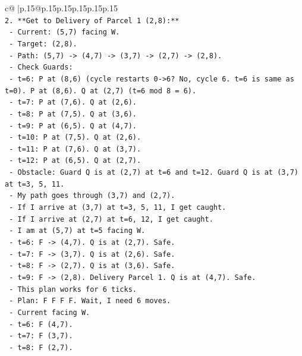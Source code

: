 \documentclass{article}
\begin{document}
{\begin{supertabular}{c@{$\;$}|p{.15\linewidth}@{}p{.15\linewidth}p{.15\linewidth}p{.15\linewidth}p{.15\linewidth}p{.15\linewidth}}
{{{\\ 
\texttt{2.  **Get to Delivery of Parcel 1 (2,8):**} \\
\texttt{    {-} Current: (5,7) facing W.} \\
\texttt{    {-} Target: (2,8).} \\
\texttt{    {-} Path: (5,7) {-}> (4,7) {-}> (3,7) {-}> (2,7) {-}> (2,8).} \\
\texttt{    {-} Check Guards:} \\
\texttt{      {-} t=6: P at (8,6) (cycle restarts 0{-}>6? No, cycle 6. t=6 is same as t=0). P at (8,6). Q at (2,7) (t=6 mod 8 = 6).} \\
\texttt{      {-} t=7: P at (7,6). Q at (2,6).} \\
\texttt{      {-} t=8: P at (7,5). Q at (3,6).} \\
\texttt{      {-} t=9: P at (6,5). Q at (4,7).} \\
\texttt{      {-} t=10: P at (7,5). Q at (2,6).} \\
\texttt{      {-} t=11: P at (7,6). Q at (3,7).} \\
\texttt{      {-} t=12: P at (6,5). Q at (2,7).} \\
\texttt{    {-} Obstacle: Guard Q is at (2,7) at t=6 and t=12. Guard Q is at (3,7) at t=3, 5, 11.} \\
\texttt{    {-} My path goes through (3,7) and (2,7).} \\
\texttt{    {-} If I arrive at (3,7) at t=3, 5, 11, I get caught.} \\
\texttt{    {-} If I arrive at (2,7) at t=6, 12, I get caught.} \\
\texttt{    {-} I am at (5,7) at t=5 facing W.} \\
\texttt{    {-} t=6: F {-}> (4,7). Q is at (2,7). Safe.} \\
\texttt{    {-} t=7: F {-}> (3,7). Q is at (2,6). Safe.} \\
\texttt{    {-} t=8: F {-}> (2,7). Q is at (3,6). Safe.} \\
\texttt{    {-} t=9: F {-}> (2,8). Delivery Parcel 1. Q is at (4,7). Safe.} \\
\texttt{    {-} This plan works for 6 ticks.} \\
\texttt{    {-} Plan: F F F F. Wait, I need 6 moves.} \\
\texttt{    {-} Current facing W.} \\
\texttt{    {-} t=6: F (4,7).} \\
\texttt{    {-} t=7: F (3,7).} \\
\texttt{    {-} t=8: F (2,7).} \\
}}}
\end{supertabular}}
\end{document}
